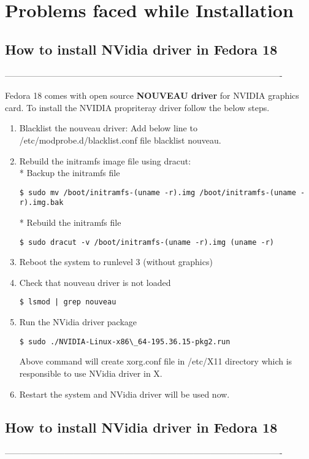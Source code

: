 \chapter{Problems faced while Installation}

\section{How to install NVidia driver in Fedora 18}
-------------------------------------------------------------------------------------------------

Fedora 18 comes with open source \textbf{NOUVEAU driver} for NVIDIA graphics card. To install the NVIDIA propriteray driver follow the below steps.

\begin{enumerate}
\item Blacklist the nouveau driver: Add below line to /etc/modprobe.d/blacklist.conf file blacklist nouveau.
\item Rebuild the initramfs image file using dracut:\\
* Backup the initramfs file
\begin{verbatim}
$ sudo mv /boot/initramfs-(uname -r).img /boot/initramfs-(uname -r).img.bak
\end{verbatim}
* Rebuild the initramfs file
\begin{verbatim}
$ sudo dracut -v /boot/initramfs-(uname -r).img (uname -r)
\end{verbatim}
\item Reboot the system to runlevel 3 (without graphics)
\item Check that nouveau driver is not loaded
\begin{verbatim}
$ lsmod | grep nouveau
\end{verbatim}
\item Run the NVidia driver package
\begin{verbatim}
$ sudo ./NVIDIA-Linux-x86\_64-195.36.15-pkg2.run
\end{verbatim}
Above command will create xorg.conf file in /etc/X11 directory which is responsible to use NVidia driver in X.
\item Restart the system and NVidia driver will be used now.
\end{enumerate}

\section{How to install NVidia driver in Fedora 18}
-------------------------------------------------------------------------------------------------

